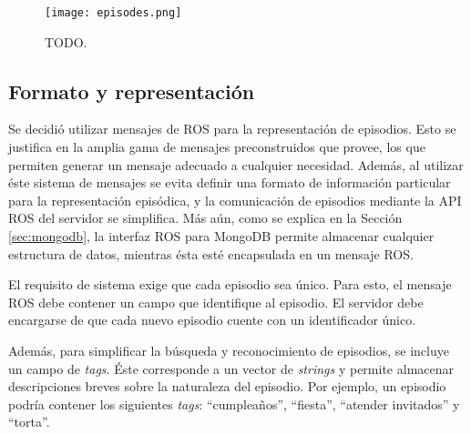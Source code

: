 \begin{figure}[!h]
	\centering
	\texttt{[image: episodes.png]}
	\caption{\small TODO.}
	\label{img:episodes}
\end{figure}


\subsection{Formato y representación}

Se decidió utilizar mensajes de ROS para la representación de episodios. Esto se justifica en la amplia gama de mensajes preconstruidos que provee, los que permiten generar un mensaje adecuado a cualquier necesidad. Además, al utilizar éste sistema de mensajes se evita definir una formato de información particular para la representación episódica, y la comunicación de episodios mediante la API ROS del servidor se simplifica. Más aún, como se explica en la Sección \ref{sec:mongodb}, la interfaz ROS para MongoDB permite almacenar cualquier estructura de datos, mientras ésta esté encapsulada en un mensaje ROS.

El requisito de sistema  exige que cada episodio sea único. Para esto, el mensaje ROS debe contener un campo que identifique al episodio. El servidor debe encargarse de que cada nuevo episodio cuente con un identificador único.

Además, para simplificar la búsqueda y reconocimiento de episodios, se incluye un campo de \textit{tags}. Éste corresponde a un vector de \textit{strings} y permite almacenar descripciones breves sobre la naturaleza del episodio. Por ejemplo, un episodio podría contener los siguientes \textit{tags}: ``cumpleaños'', ``fiesta'', ``atender invitados'' y ``torta''.

 
